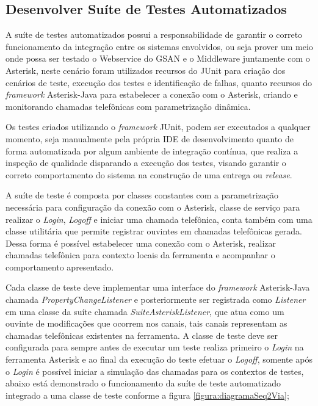 \subsection{Desenvolver Suíte de Testes Automatizados}

A suíte de testes automatizados possui a responsabilidade de garantir o correto funcionamento da integração entre os sistemas envolvidos, ou seja prover um meio onde possa ser testado o Webservice do GSAN e o Middleware juntamente com o Asterisk, neste cenário foram utilizados recursos do JUnit para criação dos cenários de teste, execução dos testes e identificação de falhas, quanto recursos do \textit{framework} Asterisk-Java para estabelecer a conexão com o Asterisk, criando e monitorando chamadas telefônicas com parametrização dinâmica.   

Os testes criados utilizando o \textit{framework} JUnit, podem ser executados a qualquer momento, seja manualmente pela própria IDE de desenvolvimento quanto de forma automatizada por algum ambiente de integração contínua, que realiza a inspeção de qualidade disparando a execução dos testes, visando garantir o correto comportamento do sistema na construção de uma entrega ou \textit{release}.

A suíte de teste é composta por classes constantes com a parametrização necessária para configuração da conexão com o Asterisk, classe de serviço para realizar o \textit{Login}, \textit{Logoff} e iniciar uma chamada telefônica, conta também com uma classe utilitária que permite registrar ouvintes em chamadas telefônicas gerada. Dessa forma é possível estabelecer uma conexão com o Asterisk, realizar chamadas telefônica para contexto locais da ferramenta e acompanhar o comportamento apresentado.

Cada classe de teste deve implementar uma interface do \textit{framework} Asterisk-Java chamada \textit{PropertyChangeListener} e posteriormente ser registrada como \textit{Listener} em uma classe da suíte chamada \textit{SuiteAsteriskListener}, que atua como um ouvinte de modificações que ocorrem nos canais, tais canais representam as chamadas telefônicas existentes na ferramenta. 
A classe de teste deve ser configurada para sempre antes de executar um teste realiza primeiro o \textit{Login} na ferramenta Asterisk e ao final da execução do teste efetuar o \textit{Logoff}, somente após o \textit{Login} é possível iniciar a simulação das chamadas para os contextos de testes, abaixo está demonstrado o funcionamento da suíte de teste automatizado integrado a uma classe de teste conforme a figura \ref{figura:diagramaSeq2Via};

